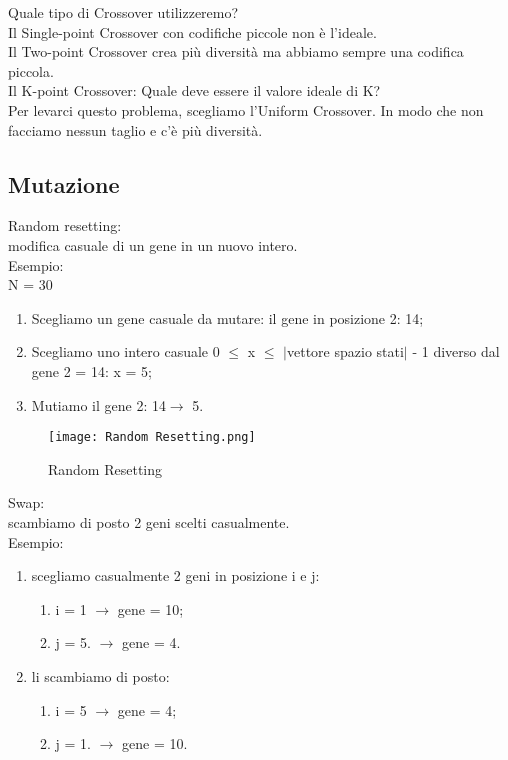 \documentclass[10pt,a4paper]{article}
\begin{document}
    Quale tipo di Crossover utilizzeremo?\\
    Il Single-point Crossover con codifiche piccole non è l’ideale.\\
    Il Two-point Crossover crea più diversità ma abbiamo sempre una codifica piccola.\\
    Il K-point Crossover: Quale deve essere il valore ideale di K?\\
    Per levarci questo problema, scegliamo l’Uniform Crossover. In modo che non facciamo nessun taglio 
    e c’è più diversità.\\
    
    \subsection{Mutazione}
    \label{Mutazione}
    Random resetting:\\
    modifica casuale di un gene in un nuovo intero.\\
    Esempio:\\
    N = 30\\
    \begin{enumerate}
      \item Scegliamo un gene casuale da mutare: il gene in posizione 2: 14;
      \item Scegliamo uno intero casuale 0 $\leq$ x $\leq$ $\mid$vettore spazio stati$\mid$ - 1 diverso dal gene 2 = 14: x = 5;
      \item Mutiamo il gene 2: 14$ \rightarrow$ 5.
    \end{enumerate}
    \begin{figure}[h!]
      \centering
      \caption{Random Resetting}
      \texttt{[image: Random Resetting.png]}
      \label{Random Resetting}
    \end{figure}
    
    Swap:\\
    scambiamo di posto 2 geni scelti casualmente.\\
    Esempio:\\
    \begin{enumerate}
    	\item scegliamo casualmente 2 geni in posizione i e j: 
    	\begin{enumerate}
    		\item i = 1 $\rightarrow$ gene =  10;
    		\item j = 5. $\rightarrow$ gene = 4.
    	\end{enumerate}
    	\item li scambiamo di posto:
    	\begin{enumerate}
    		\item i = 5 $\rightarrow$ gene = 4;
    		\item j = 1. $\rightarrow$ gene = 10.
    	\end{enumerate}
    \end{enumerate}
    
\end{document}
